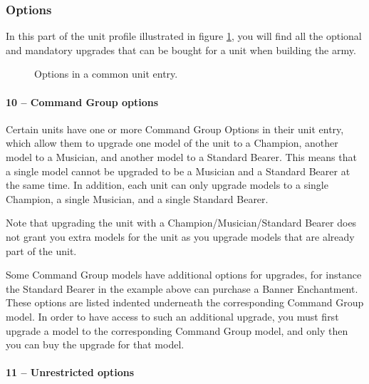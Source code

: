 \newpage
\subsubsection{Options}

In this part of the unit profile illustrated in figure \ref{figure/unit_entry_options}, you will find all the optional and mandatory upgrades that can be bought for a unit when building the army.

\newcommand{\figTINMENOptionsTen}{10 -- Command Group Options}
\newcommand{\figTINMENOptionsEleven}{11 -- Unrestricted\\ options}
\newcommand{\figTINMENOptionsTwelve}{12 -- Restricted\\ options}
\newcommand{\figTINMENOptionsThirteen}{13 -- Model Rules}

\begin{figure}[H]
	
	\caption{Options in a common unit entry.}
	\label{figure/unit_entry_options}
\end{figure}

\paragraph{10 -- Command Group options}

Certain units have one or more Command Group Options in their unit entry, which allow them to upgrade one model of the unit to a Champion, another model to a Musician, and another model to a Standard Bearer. This means that a single \rnf{} model cannot be upgraded to be a Musician and a Standard Bearer at the same time. In addition, each unit can only upgrade models to a single Champion, a single Musician, and a single Standard Bearer.

Note that upgrading the unit with a Champion/Musician/Standard Bearer does not grant you extra models for the unit as you upgrade models that are already part of the unit.

Some Command Group models have additional options for upgrades, for instance the Standard Bearer in the example above can purchase a Banner Enchantment. These options are listed indented underneath the corresponding Command Group model. In order to have access to such an additional upgrade, you must first upgrade a model to the corresponding Command Group model, and only then you can buy the upgrade for that model.

\paragraph{11 -- Unrestricted options}

